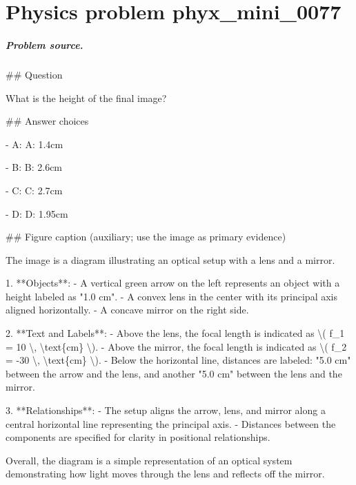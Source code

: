 
\chapter{Physics problem phyx\_mini\_0077}
\label{ch:PhyXMiniProblems_problem_phyx_mini_0077}

\paragraph{Problem source.}
\#\# Question

What is the height of the final image?

\#\# Answer choices

- A: A: 1.4cm

- B: B: 2.6cm

- C: C: 2.7cm

- D: D: 1.95cm

\#\# Figure caption (auxiliary; use the image as primary evidence)

The image is a diagram illustrating an optical setup with a lens and a mirror.

1. **Objects**:
   - A vertical green arrow on the left represents an object with a height labeled as "1.0 cm".
   - A convex lens in the center with its principal axis aligned horizontally.
   - A concave mirror on the right side.

2. **Text and Labels**:
   - Above the lens, the focal length is indicated as \textbackslash{}( f\_1 = 10 \textbackslash{}, \textbackslash{}text\{cm\} \textbackslash{}).
   - Above the mirror, the focal length is indicated as \textbackslash{}( f\_2 = -30 \textbackslash{}, \textbackslash{}text\{cm\} \textbackslash{}).
   - Below the horizontal line, distances are labeled: "5.0 cm" between the arrow and the lens, and another "5.0 cm" between the lens and the mirror.

3. **Relationships**:
   - The setup aligns the arrow, lens, and mirror along a central horizontal line representing the principal axis.
   - Distances between the components are specified for clarity in positional relationships.

Overall, the diagram is a simple representation of an optical system demonstrating how light moves through the lens and reflects off the mirror.

